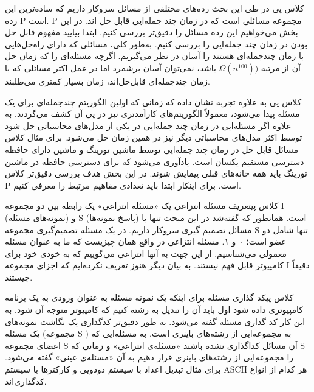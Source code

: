 \begin{itemframe}{کلاس پی}
\decLineSpace
\itm
در طی این بحث رده‌های مختلفی از مسائل سروکار داریم که ساده‌ترین این رده P است. P مجموعه مسائلی است که در زمان چند جمله‌ایی قابل حل اند. در این بخش می‌خواهیم این رده مسائل را دقیق‌تر بررسی کنیم.
\itm
ابتدا بیایید مفهوم قابل حل بودن در زمان چند جمله‌ایی را بررسی کنیم. به‌طور کلی، مسائلی که دارای راه‌حل‌هایی با زمان چندجمله‌ای هستند را آسان در نظر می‌گیریم.
\itm
اگرچه مسئله‌ای را که زمان حل آن از مرتبه
$\Omega(n^{100}))$
 باشد، نمی‌توان آسان برشمرد اما در عمل اکثر مسائلی که با زمان چندجمله‌ای قابل‌حل‌اند، زمان بسیار کمتری می‌طلبند.
\end{itemframe}
\begin{itemframe}{کلاس پی}
\itm
به علاوه تجربه نشان داده که زمانی که اولین الگوریتم چندجمله‌ای برای یک مسئله پیدا می‌شود، معمولاً الگوریتم‌های کارآمدتری نیز در پی آن کشف می‌گردند. به علاوه اگر مسئله‌ایی در زمان چند جمله‌ایی در یکی از مدل‌های محاسباتی حل شود توسط اکثر مدل‌های محاسباتی دیگر نیز در همین زمان حل می‌شود.
\itm
برای مثال کلاس مسائل قابل حل در زمان چند جمله‌ایی توسط ماشین تورینگ و ماشین دارای حافظه دسترسی مستقیم یکسان است.
‌یادآوری می‌شود که برای دسترسی حافظه در ماشین تورینگ باید همه خانه‌های قبلی پیمایش شوند.
\itm
در این بخش هدف بررسی دقیق‌تر کلاس P است. برای اینکار ابتدا باید تعدادی مفاهیم مرتبط را معرفی کنیم.
\end{itemframe}

\begin{itemframe-s}{کلاس پی}{تعریف مسئله انتزاعی}
\itm
یک «مسئله انتزاعی»
 یک رابطه بین دو مجموعه I (نمونه‌های مسئله) و S (پاسخ نمونه‌ها) است.
همانطور که گفته‌شد در این مبحث تنها با مسائل تصمیم گیری سروکار داریم.
در یک مسئله تصمیم‌گیری مجموعه S تنها شامل دو عضو است؛ ۰ و ۱.
\itm
مسئله انتزاعی در واقع همان چیزیست که ما به عنوان مسئله معمولی می‌شناسیم. از این جهت به آنها انتزاعی می‌گوییم که به خودی خود  برای کامپیوتر قابل فهم نیستند. به بیان دیگر هنوز تعریف نکرده‌ایم که اجزای مجموعه I دقیقاً چیستند.
\end{itemframe-s}
\begin{itemframe-s}{کلاس پی}{کد گذاری مسئله}
\itm
برای اینکه یک نمونه مسئله به عنوان ورودی به یک برنامه کامپیوتری داده شود اول باید آن را تبدیل به رشته کنیم که کامپیوتر متوجه آن شود.
\itm
به این کار کد گذاری
مسئله گفته می‌شود. به طور دقیق‌تر کدگذاری یک نگاشت نمونه‌های یک مسئله (مجموعه S )
به مجموعه‌ایی از رشته‌های باینری است.
\itm
به مسئله‌ایی که اعضای مجموعه S آن مسائل کداگذاری نشده باشند «مسئله‌ی انتزاعی»
و زمانی که S را مجموعه‌ایی از رشته‌های باینری قرار دهیم به آن «مسئله‌ی عینی»
گفته می‌شود.
\itm
برای مثال تبدیل اعداد با سیستم دودویی و کارکترها با سیستم ASCII هر کدام از انواع کدگذاری‌اند.
\end{itemframe-s}

